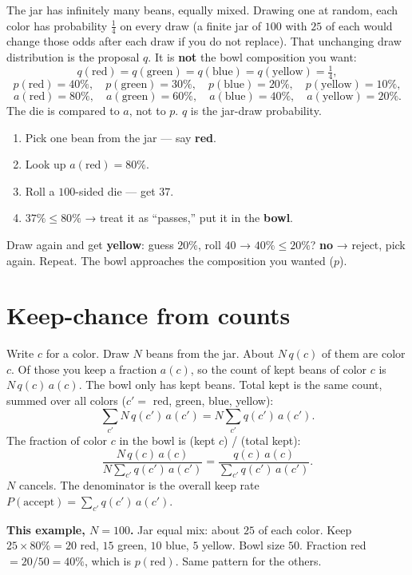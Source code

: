 The jar has infinitely many beans, equally mixed. Drawing one at random, each color has probability $\tfrac14$ on every draw (a finite jar of $100$ with $25$ of each would change those odds after each draw if you do not replace). That unchanging draw distribution is the proposal $q$. It is \textbf{not} the bowl composition you want: \[
q(\mathrm{red})=q(\mathrm{green})=q(\mathrm{blue})=q(\mathrm{yellow})=\tfrac14,
\] \[
p(\mathrm{red})=40\%,\quad
p(\mathrm{green})=30\%,\quad
p(\mathrm{blue})=20\%,\quad
p(\mathrm{yellow})=10\%,
\] \[
a(\mathrm{red})=80\%,\quad
a(\mathrm{green})=60\%,\quad
a(\mathrm{blue})=40\%,\quad
a(\mathrm{yellow})=20\%.
\] The die is compared to $a$, not to $p$. $q$ is the jar-draw probability.

\begin{enumerate}
\item Pick one bean from the jar --- say \textbf{red}.
\item Look up $a(\mathrm{red})=80\%$.
\item Roll a $100$-sided die --- get $37$.
\item $37\%\le 80\%$ → treat it as ``passes,'' put it in the \textbf{bowl}.
\end{enumerate}
Draw again and get \textbf{yellow}: guess $20\%$, roll $40$ → $40\%\le 20\%$? \textbf{no} → reject, pick again. Repeat. The bowl approaches the composition you wanted ($p$).

\section{Keep-chance from counts}

Write $c$ for a color. Draw $N$ beans from the jar. About $N\,q(c)$ of them are color $c$. Of those you keep a fraction $a(c)$, so the count of kept beans of color $c$ is $N\,q(c)\,a(c)$. The bowl only has kept beans. Total kept is the same count, summed over all colors ($c'=$ red, green, blue, yellow): \[
\sum_{c'} N\,q(c')\,a(c')
=
N\sum_{c'} q(c')\,a(c').
\] The fraction of color $c$ in the bowl is (kept $c$) / (total kept): \begin{equation}
\frac{N\,q(c)\,a(c)}{N\sum_{c'} q(c')\,a(c')}
=
\frac{q(c)\,a(c)}{\sum_{c'} q(c')\,a(c')}.
\tag{H.1}
\end{equation} $N$ cancels. The denominator is the overall keep rate $P(\mathrm{accept})=\sum_{c'} q(c')\,a(c')$.

\textbf{This example, $N=100$.} Jar equal mix: about $25$ of each color. Keep $25\times 80\%=20$ red, $15$ green, $10$ blue, $5$ yellow. Bowl size $50$. Fraction red $=20/50=40\%$, which is $p(\mathrm{red})$. Same pattern for the others.

